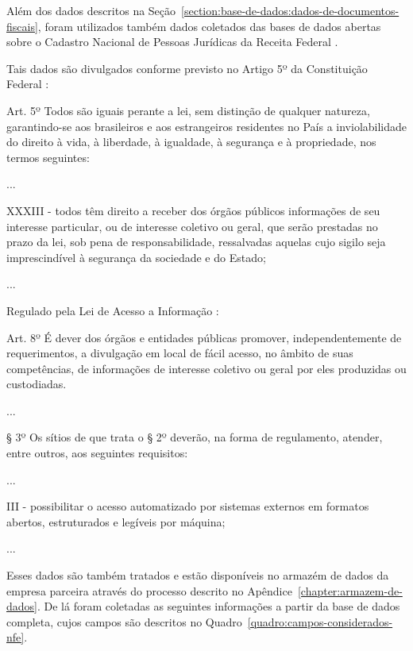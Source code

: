 Além dos dados descritos na Seção~\ref{section:base-de-dados:dados-de-documentos-fiscais}, foram utilizados também dados coletados das bases de dados abertas sobre o Cadastro Nacional de Pessoas Jurídicas da Receita Federal \cite{receita:dados-publicos:cnpj}.

Tais dados são divulgados conforme previsto no Artigo 5º da Constituição Federal \cite{constituicao:1988}:

\begin{citacao}
Art. 5º Todos são iguais perante a lei, sem distinção de qualquer natureza, garantindo-se aos brasileiros e aos estrangeiros residentes no País a inviolabilidade do direito à vida, à liberdade, à igualdade, à segurança e à propriedade, nos termos seguintes:

...

XXXIII - todos têm direito a receber dos órgãos públicos informações de seu interesse particular, ou de interesse coletivo ou geral, que serão prestadas no prazo da lei, sob pena de responsabilidade, ressalvadas aquelas cujo sigilo seja imprescindível à segurança da sociedade e do Estado;

...
\end{citacao}

Regulado pela Lei de Acesso a Informação \cite{lei:12527:lei-de-acesso-a-informacao}:

\begin{citacao}
Art. 8º É dever dos órgãos e entidades públicas promover, independentemente de requerimentos, a divulgação em local de fácil acesso, no âmbito de suas competências, de informações de interesse coletivo ou geral por eles produzidas ou custodiadas.

...

§ 3º Os sítios de que trata o § 2º deverão, na forma de regulamento, atender, entre outros, aos seguintes requisitos:

...

III - possibilitar o acesso automatizado por sistemas externos em formatos abertos, estruturados e legíveis por máquina;

...
\end{citacao}

Esses dados são também tratados e estão disponíveis no armazém de dados da empresa parceira através do processo descrito no Apêndice~\ref{chapter:armazem-de-dados}. De lá foram coletadas as seguintes informações a partir da base de dados completa, cujos campos são descritos no Quadro~\ref{quadro:campos-considerados-nfe}.

